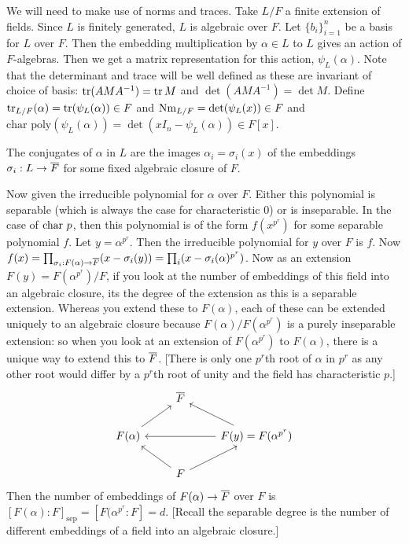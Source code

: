 We will need to make use of norms and traces. Take $L/F$ a finite extension of fields. Since $L$ is finitely generated, $L$ is algebraic over $F$. Let $\{b_i\}_{i=1}^n$ be a basis for $L$ over $F$. Then the embedding multiplication by $\alpha \in L$ to $L$ gives an action of $F$-algebras. Then we get a matrix representation for this action, $\psi_L(\alpha)$. Note that the determinant and trace will be well defined as these are invariant of choice of basis: $\operatorname{tr}(AMA^{-1})=\operatorname{tr} M$ and $\det(AMA^{-1})=\det M$. Define $\operatorname{tr}_{L/F}(\alpha)=\operatorname{tr}(\psi_L(\alpha)) \in F$ and $\text{Nm}_{L/F}=\det(\psi_L(x)) \in F$ and $\text{char poly}(\psi_L(\alpha))=\det(xI_n - \psi_L(\alpha)) \in F[x]$.

\begin{dfn}[Conjugates]
The conjugates of $\alpha$ in $L$ are the images $\alpha_i=\sigma_i(x)$ of the embeddings $\sigma_i: L \to \overline{F}$ for some fixed algebraic closure of $F$. 
\end{dfn}

Now given the irreducible polynomial for $\alpha$ over $F$. Either this polynomial is separable (which is always the case for characteristic 0) or is inseparable. In the case of $\text{char } p$, then this polynomial is of the form $f(x^{p^r})$ for some separable polynomial $f$. Let $y=\alpha^{p^r}$. Then the irreducible polynomial for $y$ over $F$ is $f$. Now $f(x)=\prod_{\sigma_i: F(\alpha) \to \overline{F}} (x-\sigma_i(y))=\prod_i (x-\sigma_i(\alpha)^{p^r})$. Now as an extension $F(y)=F(\alpha^{p^r})/F$, if you look at the number of embeddings of this field into an algebraic closure, its the degree of the extension as this is a separable extension. Whereas you extend these to $F(\alpha)$, each of these can be extended uniquely to an algebraic closure because $F(\alpha)/F(\alpha^{p^r})$ is a purely inseparable extension: so when you look at an extension of $F(\alpha^{p^r})$ to $F(\alpha)$, there is a unique way to extend this to $\overline{F}$. [There is only one $p^r$th root of $\alpha$ in $p^r$ as any other root would differ by a $p^r$th root of unity and the field has characteristic $p$.]
	\[
	\begin{tikzcd}
	& \ov{F} & \\
	F(\alpha) \arrow{ur} & & F(y)=F(\alpha^{p^r}) \arrow{ul} \arrow{ll} \\
	& F \arrow{ul} \arrow{ur} & 
	\end{tikzcd}
	\]
Then the number of embeddings of $F(\alpha) \to \overline{F}$ over $F$ is $[F(\alpha):F]_\text{sep}=[F(\alpha^{p^r}:F]=d$. [Recall the separable degree is the number of different embeddings of a field into an algebraic closure.] 

